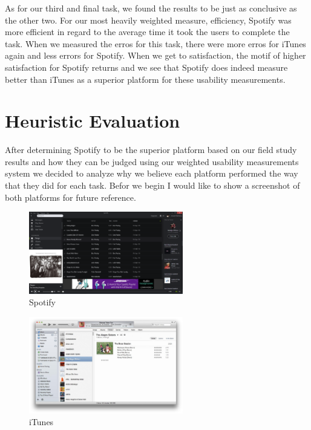 \documentclass[a4paper]{article}
\begin{document}
As for our third and final task, we found the results to be just as conclusive as the other two. For our most heavily weighted measure, efficiency, Spotify was more efficient in regard to the average time it took the users to complete the task. When we measured the erros for this task, there were more erros for iTunes again and less errors for Spotify. When we get to satisfaction, the motif of higher satisfaction for Spotify returns and we see that Spotify does indeed measure better than iTunes as a superior platform for these usability measurements.



\section{Heuristic Evaluation}

After determining Spotify to be the superior platform based on our field study results and how they can be judged using our weighted usability measurements system we decided to analyze why we believe each platform performed the way that they did for each task. Befor we begin I would like to show a screenshot of both platforms for future reference.

\begin{figure}[H]
\centering
\includegraphics[width=0.6\textwidth]{spotify.PNG}
\caption{\label{task:spotify}Spotify}
\end{figure}
\begin{figure}[H]
\centering
\includegraphics[width=0.6\textwidth]{itunes.jpg}
\caption{\label{task:iTunes}iTunes}
\end{figure}
\end{document}

